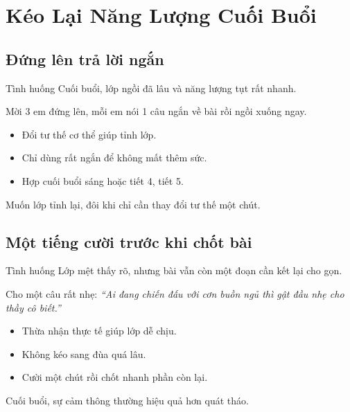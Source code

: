 \chapter{Kéo Lại Năng Lượng Cuối Buổi}

\section{Đứng lên trả lời ngắn}
\begin{tinhhuong}{Tình huống}
Cuối buổi, lớp ngồi đã lâu và năng lượng tụt rất nhanh.
\end{tinhhuong}
\begin{goiydungngay}
Mời 3 em đứng lên, mỗi em nói 1 câu ngắn về bài rồi ngồi xuống ngay.
\begin{itemize}
\item Đổi tư thế cơ thể giúp tỉnh lớp.
\item Chỉ dùng rất ngắn để không mất thêm sức.
\item Hợp cuối buổi sáng hoặc tiết 4, tiết 5.
\end{itemize}
\end{goiydungngay}
\begin{cauchot}
Muốn lớp tỉnh lại, đôi khi chỉ cần thay đổi tư thế một chút.
\end{cauchot}
\ngancach

\section{Một tiếng cười trước khi chốt bài}
\begin{tinhhuong}{Tình huống}
Lớp mệt thấy rõ, nhưng bài vẫn còn một đoạn cần kết lại cho gọn.
\end{tinhhuong}
\begin{goiydungngay}
Cho một câu rất nhẹ: \textit{``Ai đang chiến đấu với cơn buồn ngủ thì gật đầu nhẹ cho thầy cô biết.''}
\begin{itemize}
\item Thừa nhận thực tế giúp lớp dễ chịu.
\item Không kéo sang đùa quá lâu.
\item Cười một chút rồi chốt nhanh phần còn lại.
\end{itemize}
\end{goiydungngay}
\begin{cauchot}
Cuối buổi, sự cảm thông thường hiệu quả hơn quát tháo.
\end{cauchot}
\ngancach

